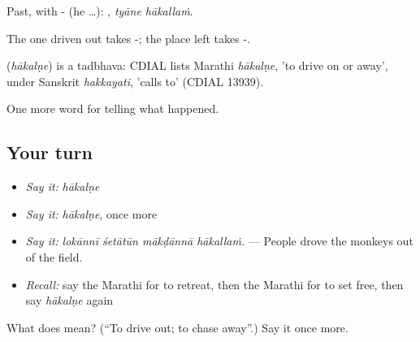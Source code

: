 Past, with - (he …):  , \emph{tyāne hākallaṁ}.

The one driven out takes -; the place left takes -.

\begin{cousinweb}
\textbf{} (\emph{hākalṇe}) is a tadbhava: CDIAL lists Marathi \emph{hākalṇe}, 'to drive on or away', under Sanskrit \emph{hakkayati}, 'calls to' (CDIAL 13939).
\end{cousinweb}

\begin{grammarlens}[title={What you've built}]
One more word for telling what happened.
\end{grammarlens}

\subsection*{Your turn}
\begin{itemize}
\raggedright
  \item \emph{Say it:} \emph{hākalṇe}
  \item \emph{Say it:} \emph{hākalṇe}, once more
  \item \emph{Say it:} \emph{lokānnī śetātūn mākḍānnā hākallaṁ.} — People drove the monkeys out of the field.
  \item \emph{Recall:} say the Marathi for to retreat, then the Marathi for to set free, then say \emph{hākalṇe} again
\end{itemize}

\begin{tcolorbox}[breakable,colback=teal!4,colframe=teal!35!black,title={Before you move on}]
What does  mean? (\textquotedblleft{}To drive out; to chase away\textquotedblright{}.) Say it once more.
\end{tcolorbox}

